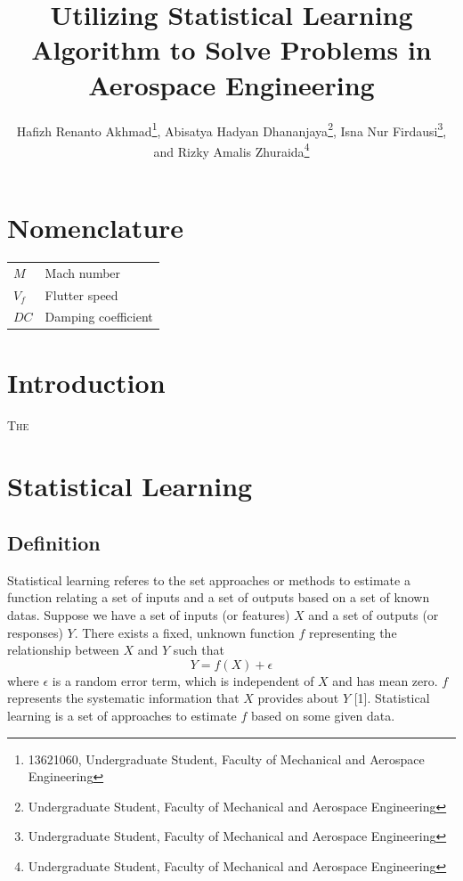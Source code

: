 \documentclass[conf]{new-aiaa}
\title{Utilizing Statistical Learning Algorithm to Solve Problems in Aerospace Engineering}
\author{Hafizh Renanto Akhmad\footnote{13621060, Undergraduate Student, Faculty of Mechanical and Aerospace Engineering}, Abisatya Hadyan Dhananjaya\footnote{Undergraduate Student, Faculty of Mechanical and Aerospace Engineering}, Isna Nur Firdausi\footnote{Undergraduate Student, Faculty of Mechanical and Aerospace Engineering}, and Rizky Amalis Zhuraida\footnote{Undergraduate Student, Faculty of Mechanical and Aerospace Engineering}}
\affil{Institut Teknologi Bandung, Bandung, Jawa Barat, 40132}
\begin{document}
\maketitle

\begin{abstract}
\lipsum[1]
\end{abstract}

\section{Nomenclature}

{\renewcommand\arraystretch{1.0}
\noindent\begin{longtable*}{@{}l @{\quad=\quad} l@{}}
    $M$ & Mach number\\
    $V_f$ & Flutter speed\\
    $DC$ & Damping coefficient
\end{longtable*}}

\section{Introduction}
\lettrine{T}{he} 

\section{Statistical Learning}
\subsection{Definition}
Statistical learning referes to the set approaches or methods to estimate a function relating a set of inputs and a set of outputs based on a set of known datas. Suppose we have a set of inputs (or features) $X$ and a set of outputs (or responses) $Y$. There exists a fixed, unknown function $f$ representing the relationship between $X$ and $Y$ such that 
\begin{equation} \label{eq:statslearndef}
    Y = f(X) + \epsilon
\end{equation}
where $\epsilon$ is a random error term, which is independent of $X$ and has mean zero. $f$ represents the systematic information that $X$ provides about $Y$ [1]. Statistical learning is a set of approaches to estimate $f$ based on some given data.
\end{document}

